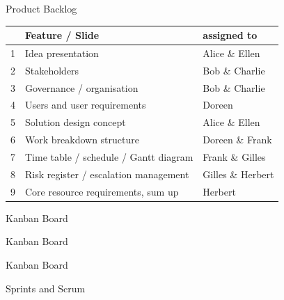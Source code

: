 \begin{frame}{Product Backlog}
    \begin{tabular}{r l l}
        \toprule
        & Feature / Slide & assigned to \\
        \midrule
        1 & Idea presentation & Alice \& Ellen \\
        2 & Stakeholders & Bob \& Charlie \\
        3 & Governance / organisation & Bob \& Charlie \\
        4 & Users and user requirements & Doreen \\
        5 & Solution design concept & Alice \& Ellen \\
        6 & Work breakdown structure & Doreen \& Frank \\
        7 & Time table / schedule / Gantt diagram & Frank \& Gilles \\
        8 & Risk register / escalation management &  Gilles \& Herbert \\
        9 & Core resource requirements, sum up & Herbert \\
        \bottomrule
    \end{tabular}
\end{frame}



\begin{frame}{Kanban Board}
    \end{frame}

\begin{frame}{Kanban Board}        \end{frame}

\begin{frame}{Kanban Board}        
\end{frame}

\begin{frame}{Sprints and Scrum}
    
\end{frame}

